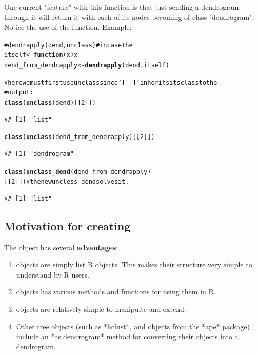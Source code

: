\documentclass[shortnames,nojss,article]{jss}\usepackage{graphicx, color}
\makeatletter
\newcommand{\hlfunctioncall}[1]{\textcolor[rgb]{0.501960784313725,0,0.329411764705882}{\textbf{#1}}}%
\newcommand{\hlcomment}[1]{\textcolor[rgb]{0.180392156862745,0.6,0.341176470588235}{#1}}%
\newenvironment{kframe}{%
 \def\at@end@of@kframe{}%
 \ifinner\ifhmode%
  \def\at@end@of@kframe{\end{minipage}}%
  \begin{minipage}{\columnwidth}%
 \fi\fi%
 \def\FrameCommand##1{\hskip\@totalleftmargin \hskip-\fboxsep
 \colorbox{shadecolor}{##1}\hskip-\fboxsep
     \hskip-\linewidth \hskip-\@totalleftmargin \hskip\columnwidth}%
 \MakeFramed {\advance\hsize-\width
   \@totalleftmargin\z@ \linewidth\hsize
   \@setminipage}}%
 {\par\unskip\endMakeFramed%
 \at@end@of@kframe}
\newenvironment{knitrout}{}{} %
\makeatother
\begin{document}
One current "feature" with this function is that just sending a dendrogram through it will return it with each of its nodes becoming of class "dendrogram". Notice the use of the  function. Example:

\begin{knitrout}
\color{fgcolor}\begin{kframe}
\begin{alltt}
\hlcomment{# dendrapply(dend, unclass) # in case the}
itself <- \hlfunctioncall{function}(x) x
dend_from_dendrapply <- \hlfunctioncall{dendrapply}(dend, itself)

\hlcomment{# here we must first use unclass since '[[]]' inherits its class to the}
\hlcomment{# output:}
\hlfunctioncall{class}(\hlfunctioncall{unclass}(dend)[[2]])
\end{alltt}
\begin{verbatim}
## [1] "list"
\end{verbatim}
\begin{alltt}
\hlfunctioncall{class}(\hlfunctioncall{unclass}(dend_from_dendrapply)[[2]])
\end{alltt}
\begin{verbatim}
## [1] "dendrogram"
\end{verbatim}
\begin{alltt}
\hlfunctioncall{class}(\hlfunctioncall{unclass_dend}(dend_from_dendrapply)[[2]])  \hlcomment{# the new uncless_dend solves it.}
\end{alltt}
\begin{verbatim}
## [1] "list"
\end{verbatim}
\end{kframe}
\end{knitrout}




\subsection{Motivation for creating }



The  object has several \textbf{advantages}:

\begin{enumerate}
   \item {} objects are simply list R objects. This makes their structure  very simple to understand by R users.
   \item {} objects has various methods and functions for using them in R. 
   \item {} objects are relatively simple to manipulte and extend.
   \item Other tree objects (such as *hclust*, and objects from the *{ape}* package) include an *as.dendrogram* method for converting their objects into a dendrogram.
\end{enumerate}
\end{document}
